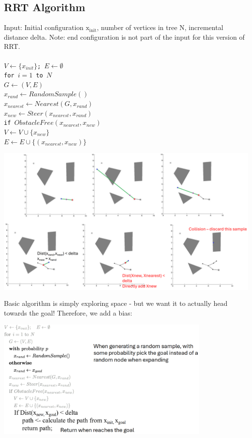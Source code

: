\documentclass[10pt]{article}
\begin{document}
\subsection*{RRT Algorithm}
Input: Initial configuration $\text{x}_{\text{init}}$, number of vertices in tree N, incremental distance delta.  Note: end configuration is not part of the input for this version of RRT.\\\\
\texttt{$V \leftarrow \{x_{init}\}$;  $E \leftarrow \emptyset$}\\
\texttt{for $i = 1$ to $N$}\\
\indent\texttt{$G \leftarrow (V, E)$}\\
\indent\textcolor{paint_blue}{\texttt{$x_{rand} \leftarrow RandomSample()$}}\\
\indent\textcolor{paint_red}{\texttt{$x_{nearest} \leftarrow Nearest(G, x_{rand})$}}\\
\indent\textcolor{paint_green}{\texttt{$x_{new} \leftarrow Steer(x_{nearest}, x_{rand})$}}\\
\indent\texttt{if $ObstacleFree(x_{nearest}, x_{new})$}\\
\indent\indent\textcolor{paint_purple}{\texttt{$V \leftarrow V \cup \{x_{new}\}$}}\\
\indent\indent\textcolor{paint_purple}{\texttt{$E \leftarrow E \cup \{(x_{nearest}, x_{new})\}$}}\\
\begin{center} 
	\includegraphics*[width=\textwidth]{L1_12.png} 
\end{center}
Basic algorithm is simply exploring space - but we want it to actually head towards the goal!  Therefore, we add a bias:
\begin{center} 
    \includegraphics*[width=0.8\textwidth]{L1_13.png} 
\end{center}
\end{document}

